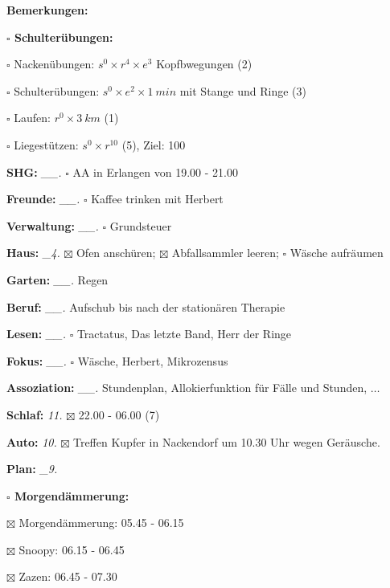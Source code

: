 \documentclass[10pt,a4paper]{article}
\newcommand\prop[1] {{\color {alizarin} {\bf #1}}}        %
\newcommand\opti[1] {{\color {amethyst} {\bf #1}}}        %
\newcommand\mand[1] {{\color {burntorange} {\bf #1}}}     %
\newcommand\topspace{\vskip -15pt \hskip 20pt}
\newcommand\bottomspace{\vskip 4pt}
\newcommand\n[1] { {\sl #1.} \hskip 5pt }
\begin{document}
\begin{mdframed}[style=daystyle]
\begin{labeling}{{\mand {Bemerkungen:}}}
\begin{minipage}{0.75\textwidth}
\begin{labeling}{\prop {$\square$ {Schulterübungen:}}}
        \setlength\itemsep{-3pt}
      \item[$\square$ Nackenübungen:]   $s^0 \times r^4 \times e^3$ Kopfbwegungen (2)
      \item[$\square$ Schulterübungen:] $s^0 \times e^2 \times 1\ min$ mit Stange und Ringe (3)
      \item[$\square$ Laufen:]          $r^0 \times 3\ km$ (1)
      \item[$\square$ Liegestützen:]    $s^0 \times r^{10}$ (5), Ziel: 100
      \end{labeling}
    \end{minipage}
    \bottomspace        
  \item[{\mand {SHG:}}]          \n{\_\_} $\square$ AA in Erlangen von 19.00 - 21.00
  \item[{\mand {Freunde:}}]      \n{\_\_} $\square$ Kaffee trinken mit Herbert
  \item[{\mand {Verwaltung:}}]   \n{\_\_} $\square$ Grundsteuer
  \item[{\mand {Haus:}}]          \n{\_4} $\boxtimes$ Ofen anschüren; $\boxtimes$ Abfallsammler leeren;
        $\square$ Wäsche aufräumen
  \item[{\mand {Garten:}}]       \n{\_\_} Regen
  \item[{\mand {Beruf:}}]        \n{\_\_} Aufschub bis nach der stationären Therapie
  \item[{\mand {Lesen:}}]        \n{\_\_} $\square$ Tractatus, Das letzte Band, Herr der Ringe
  \item[{\mand {Fokus:}}]        \n{\_\_} $\square$ Wäsche, Herbert, Mikrozensus
  \item[{\mand {Assoziation:}}]  \n{\_\_} Stundenplan, Allokierfunktion für Fälle und Stunden, $\ldots$
  \item[{\mand {Schlaf:}}]         \n{11} $\boxtimes$ 22.00 - 06.00 (7)
  \item[{\opti {Auto:}}]           \n{10} $\boxtimes$ Treffen Kupfer in Nackendorf um 10.30 Uhr wegen Geräusche.
  \item[{\mand {Plan:}}]          \n{\_9}
    \topspace
    \begin{minipage}{0.75\textwidth}  
      \begin{labeling}{\prop {$\square$ {Morgendämmerung:}}} 
        \setlength\itemsep{-3pt}
      \item[$\boxtimes$ Morgendämmerung:] 05.45 - 06.15
      \item[$\boxtimes$ Snoopy:]          06.15 - 06.45
      \item[$\boxtimes$ Zazen:]           06.45 - 07.30

\end{labeling}
\end{minipage}
\end{labeling}
\end{mdframed}
\end{document}
